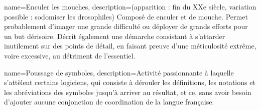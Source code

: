 {
	name=Enculer les mouches,
	description={(apparition : fin du XXe siècle, variation possible : sodomiser les drosophiles) Composé de enculer et de mouche. Permet probablement d'imager une grande difficulté ou déployer de grands efforts pour un but dérisoire. Décrit également une démarche consistant à s'attarder inutilement sur des points de détail, en faisant preuve d'une méticulosité extrême, voire excessive, au détriment de l'essentiel.}
}

{
	name=Poussage de symboles,
	description={Activité passionnante à laquelle s'attèlent certains logiciens, qui consiste à dérouler les définitions, les notations et les abréviations des symboles jusqu'à arriver au résultat, et ce, sans avoir besoin d'ajouter aucune conjonction de coordination de la langue française.}
}